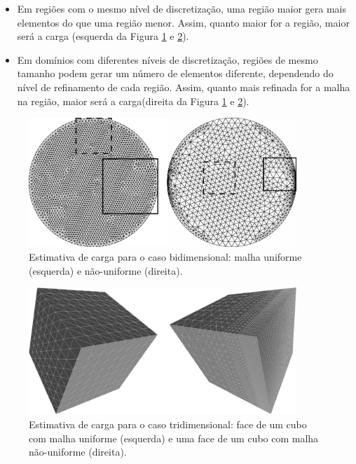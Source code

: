 \begin{itemize}
	\item Em regiões com o mesmo nível de discretização, uma região maior gera mais elementos do que uma região menor. Assim, quanto maior for a região, maior será a carga (esquerda da Figura \ref{fig:malha_uniforme_não_uniforme} e \ref{fig:malha_uniforme_não_uniforme_trid}).
	\item Em domínios com diferentes níveis de discretização, regiões de mesmo tamanho podem gerar um número de elementos diferente, dependendo do nível de refinamento de cada região. Assim, quanto mais refinada for a malha na região, maior será a carga(direita da Figura \ref{fig:malha_uniforme_não_uniforme} e \ref{fig:malha_uniforme_não_uniforme_trid}).
\end{itemize}


\begin{figure}[!ht]
	\centering
	\includegraphics[width=0.9\textwidth]{fig/meshes_transition_and_uniform.png}
	\caption{Estimativa de carga para o caso bidimensional: malha uniforme (esquerda) e não-uniforme (direita).}
	\label{fig:malha_uniforme_não_uniforme}
\end{figure}

\begin{figure}[!ht]
	\centering
	\includegraphics[width=0.9\textwidth]{fig/cubes_comp_uniform.png}
	\caption{Estimativa de carga para o caso tridimensional: face de um cubo com malha uniforme (esquerda) e uma face de um cubo com malha não-uniforme (direita).}
	\label{fig:malha_uniforme_não_uniforme_trid}
\end{figure}


